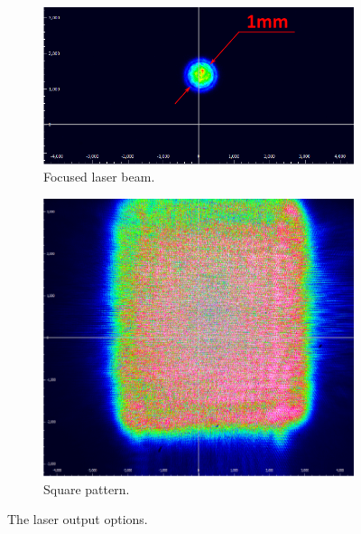 \documentclass[5p,times,twocolumn]{elsarticle}
\begin{document}
\begin{figure}[bt]
	\centering
	\begin{subfigure}[b]{0.628\linewidth}
		\includegraphics[width=\textwidth]{beamspot.pdf}
		\caption{Focused laser beam.}
		\label{fig:beamopt1}
	\end{subfigure}
	\begin{subfigure}[b]{0.354\linewidth}
		\includegraphics[width=\textwidth]{beamsquare.pdf}
		\caption{Square pattern.}
		\label{fig:beamopt2}
	\end{subfigure}
	\caption{The laser output options.}
\end{figure}
\end{document}
